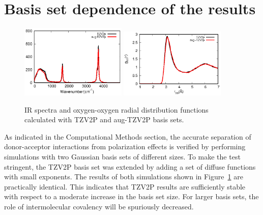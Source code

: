 \documentclass[journal=jacsat,manuscript=article]{achemso}
\begin{document}
\section{Basis set dependence of the results} 

\begin{figure}
\includegraphics[width=0.45\textwidth]{basis_ir}
\includegraphics[width=0.45\textwidth]{basis_rdf}
\caption{IR spectra and oxygen-oxygen radial distribution functions calculated with TZV2P and aug-TZV2P basis sets.}\label{Fig:basis}
\end{figure} 

As indicated in the Computational Methods section, the accurate separation of donor-acceptor interactions from polarization effects is verified by performing simulations with two Gaussian basis sets of different sizes. 
To make the test stringent, the TZV2P basis set was extended by adding a set of diffuse functions with small exponents. 
The results of both simulations shown in Figure~\ref{Fig:basis} are practically identical. 
This indicates that TZV2P results are sufficiently stable with respect to a moderate increase in the basis set size. 
For larger basis sets, the role of intermolecular covalency will be spuriously decreased.


\end{document}
